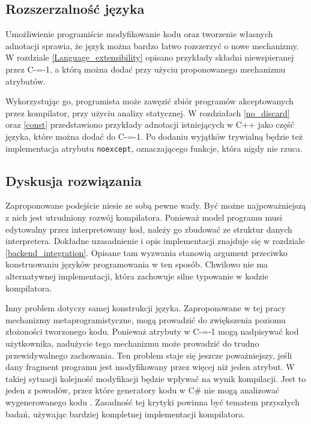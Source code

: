 \subsection{Rozszerzalność języka}

Umożliwienie programiście modyfikowanie kodu oraz tworzenie własnych adnotacji sprawia, że język można bardzo łatwo rozszerzyć o nowe mechanizmy.
W rozdziale \ref{Language_extensibility} opisano przykłady składni niewspieranej przez C-=-1, a którą można dodać przy użyciu proponowanego mechanizmu atrybutów.

Wykorzystując go, programista może zawęzić zbiór programów akceptowanych przez kompilator, przy użyciu analizy statycznej.
W rozdziałach \ref{no_discard} oraz \ref{const} przedstawiono przykłady adnotacji istniejących w C++ jako część języka, które można dodać do C-=-1.
Po dodaniu wyjątków trywialną będzie też implementacja atrybutu \lstinline{noexcept}, oznaczającego funkcje, która nigdy nie rzuca.

\subsection{Dyskusja rozwiązania}

Zaproponowane podejście niesie ze sobą pewne wady.
Być możne najpoważniejszą z nich jest utrudniony rozwój kompilatora.
Ponieważ model programu musi edytowalny przez interpretowany kod, należy go zbudować ze struktur danych interpretera.
Dokładne uzasadnienie i opis implementacji znajduje się w rozdziale \ref{backend_integration}.
Opisane tam wyzwania stanowią argument przeciwko konstruowaniu języków programowania w ten sposób. 
Chwilowo nie ma alternatywnej implementacji, która zachowuje silne typowanie w kodzie kompilatora.

Inny problem dotyczy samej konstrukcji języka.
Zaproponowane w tej pracy mechanizmy metaprogramistyczne, mogą prowadzić do zwiększenia poziomu złożoności tworzonego kodu.
Ponieważ atrybuty w C-=-1 mogą nadpisywać kod użytkownika, nadużycie tego mechanizmu może prowadzić do trudno przewidywalnego zachowania.
Ten problem staje się jeszcze poważniejszy, jeśli dany fragment programu jest modyfikowany przez więcej niż jeden atrybut.
W takiej sytuacji kolejność modyfikacji będzie wpływać na wynik kompilacji.
Jest to jeden z powodów, przez które generatory kodu w C\# nie mogą analizować wygenerowanego kodu \cite{roslyn:source_generators}.
Zasadność tej krytyki powinna być tematem przyszłych badań, używając bardziej kompletnej implementacji kompilatora.

